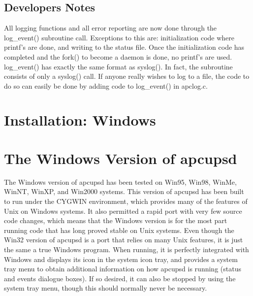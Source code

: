 {{{{{{{{{{\subsection*{Developers Notes}

\label{index-Developers-Notes-169}
All logging functions and all error reporting are now done through the
log\_event() subroutine call. Exceptions to this are: initialization code
where printf's are done, and writing to the status file. Once the
initialization code has completed and the fork() to become a daemon is done,
no printf's are used. log\_event() has exactly the same format as syslog(). In
fact, the subroutine consists of only a syslog() call. If anyone really wishes
to log to a file, the code to do so can easily be done by adding code to
log\_event() in apclog.c. 

\label{Installation-on-Windows}

\section*{Installation: Windows}

\label{index-Installation_002c-Windows-170}
\label{index-Windows_002c-Installation-171}

\label{The-Windows-Version-of-apcupsd}

\section*{The Windows Version of apcupsd}

The Windows version of apcupsd has been tested on Win95, Win98, WinMe, WinNT,
WinXP, and Win2000 systems. This version of apcupsd has been built to run
under the CYGWIN environment, which provides many of the features of Unix on
Windows systems. It also permitted a rapid port with very few source code
changes, which means that the Windows version is for the most part running
code that has long proved stable on Unix systems. Even though the Win32
version of apcupsd is a port that relies on many Unix features, it is just the
same a true Windows program. When running, it is perfectly integrated with
Windows and displays its icon in the system icon tray, and provides a system
tray menu to obtain additional information on how apcupsd is running (status
and events dialogue boxes). If so desired, it can also be stopped by using the
system tray menu, though this should normally never be necessary.  

}}}}}}}}}}
